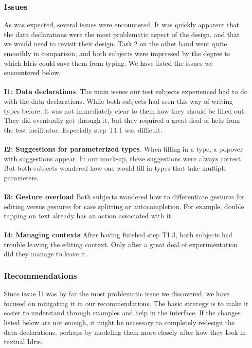 \subsubsection{Issues}
\label{sec:first_issues}
As was expected, several issues were encountered. It was quickly apparent that
the data declarations were the most problematic aspect of the design, and that
we would need to revisit their design. Task 2 on the other hand went quite
smoothly in comparison, and both subjects were impressed by the degree to
which Idris could save them from typing. We have listed the issues we
encountered below. \\ \\
\textbf{I1: Data declarations}.
The main issues our test subjects experienced had to do with the data
declarations. While both subjects had seen this way of writing types
before, it was not immediately clear to them how they should be filled out.
They did eventually get through it, but they required a great deal of help
from the test facilitator. Especially step T1.1 was difficult.\\ \\
\textbf{I2: Suggestions for parameterized types}.
When filling in a type, a popover with suggestions appear. In our mock-up,
these suggestions were always correct. But both subjects wondered how one would
fill in types that take multiple parameters. \\ \\
\textbf{I3: Gesture overload}
Both subjects wondered how to differentiate gestures for editing versus
gestures for case splitting or autocompletion. For example, double tapping on
text already has an action associated with it. \\ \\
\textbf{I4: Managing contexts}
After having finished step T1.3, both subjects had trouble leaving the editing
context. Only after a great deal of experimentation did they manage to leave
it.

\subsubsection{Recommendations}
\label{sec:first_recommendations}
Since issue I1 was by far the most problematic issue we discovered, we have
focused on mitigating it in our recommendations. The basic strategy is to make
it easier to understand through examples and help in the interface. If the
changes listed below are not enough, it might be necessary to completely
redesign the data declarations, perhaps by modeling them more closely after how
they look in textual Idris.

